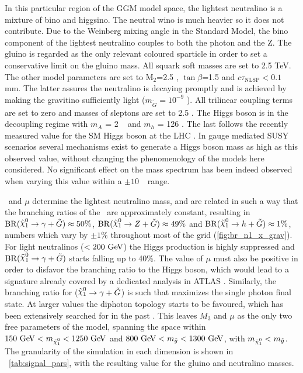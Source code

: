 In this particular region of the GGM model space, the lightest neutralino is a mixture of bino and higgsino. The neutral wino is much heavier so it
does not contribute. Due to the Weinberg mixing angle in the Standard Model, the bino component of the lightest neutralino couples to both the photon and the Z.
The gluino is regarded as the only relevant coloured sparticle in order to set a conservative limit on the gluino mass. All squark soft masses are set to 2.5 TeV.
The other model parameters are set to M$_2$=2.5 \tev, $\tan\beta$=1.5 and $c\tau_{\mathrm{NLSP}} < 0.1$ mm. The latter assures the neutralino is decaying promptly
and is achieved by making the gravitino sufficiently light ($m_{\tilde{G}}=10^{-9}$ \gev). All trilinear coupling terms are set to zero and masses of sleptons
are set to 2.5 \tev. The Higgs boson is in the decoupling regime with $m_{A}$ = 2 \tev~ and $m_{h}$ = 126 \gev. The last follows the recently measured value
for the SM Higgs boson at the LHC \cite{ATLAS-CONF-2013-014,CMS-PAS-HIG-14-009}. In gauge mediated SUSY scenarios several mechanisms exist \cite{Craig:2011yk,Auzzi:2011eu,Csaki:2012fh,Larsen:2012rq,Craig:2012hc}
to generate a Higgs boson mass as high as this observed value, without changing the phenomenology of the models here considered. No significant effect on the mass spectrum
has been indeed observed when varying this value within a $\pm 10~$ \gev\ range.

\Mone\ and $\mu$ determine the lightest neutralino mass, and are related in such a way that the branching ratios of the \ninoone\ are approximately constant,
resulting in ${\rm BR}(\ninoone \to \gam + \gravino) \approx 50\%$, ${\rm BR}(\ninoone \to Z + \gravino) \approx 49\%$ and ${\rm BR}(\ninoone \to h + \gravino) \approx 1\%$,
numbers which vary by $\pm 1\%$ throughout most of the grid (\Fig \ref{fig:br_n1_x_grav}). For light neutralinos ($<200\gev$) the Higgs production is highly
suppressed and ${\rm BR}(\ninoone \to \gam + \gravino)$ starts falling up to 40\%. The value of $\mu$ must also be positive in order to disfavor the branching ratio
to the Higgs boson, which would lead to a signature already covered by a dedicated analysis in ATLAS \cite{Aad:2012jva}. Similarly, the branching ratio for
($\ninoone \to \gam + \gravino$) is such that maximizes the single photon final state. At larger values the diphoton topology starts to be favoured, which has been
extensively searched for in the past \cite{Aad2012519,Aad:2011kz}. This leaves $M_3$ and $\mu$ as the only two free parameters of the model, spanning the space
within $150\gev < m_{\ninoone} < 1250 \gev$ and $800\gev < m_{\gluino} < 1300 \gev$, with $m_{\ninoone} < m_{\gluino}$. The granularity of the simulation in each
dimension is shown in \Tab\ \ref{tab:signal_pars}, with the resulting value for the gluino and neutralino masses.

